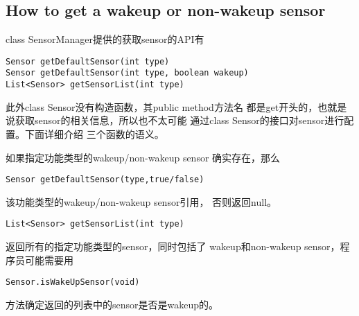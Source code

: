 
\subsection{How to get a wakeup or non-wakeup sensor}
class SensorManager提供的获取sensor的API有
\begin{lstlisting}
Sensor getDefaultSensor(int type)
Sensor getDefaultSensor(int type, boolean wakeup)
List<Sensor> getSensorList(int type)
\end{lstlisting}
此外class Sensor没有构造函数，其public method方法名
都是get开头的，也就是说获取sensor的相关信息，所以也不太可能
通过class Sensor的接口对sensor进行配置。下面详细介绍
三个函数的语义。
\par{
如果指定功能类型的wakeup/non-wakeup sensor
确实存在，那么
\begin{lstlisting}
Sensor getDefaultSensor(type,true/false)
\end{lstlisting}
该功能类型的wakeup/non-wakeup sensor引用，
否则返回null。
}
\par{
\begin{lstlisting}
List<Sensor> getSensorList(int type)
\end{lstlisting}
返回所有的指定功能类型的sensor，同时包括了
wakeup和non-wakeup sensor，程序员可能需要用
\begin{lstlisting}
Sensor.isWakeUpSensor(void)
\end{lstlisting}
方法确定返回的列表中的sensor是否是wakeup的。
}

